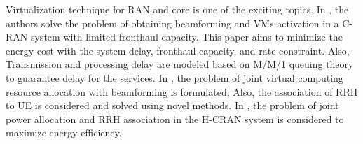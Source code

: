 \documentclass[conference]{IEEEtran}
\begin{document}
Virtualization technique for RAN and core is one of the exciting topics.  
In \cite{SystemCostMinimization,guo2016exploiting}, the authors solve the problem of obtaining beamforming and VMs activation in a C-RAN system with limited fronthaul capacity. 
This paper aims to minimize the energy cost with the system delay, fronthaul capacity, and rate constraint. 
Also, Transmission and processing delay are modeled based on M/M/1 queuing theory to guarantee delay for the services.
 In \cite{luong2018joint,luong2018novel}, the problem of joint virtual computing resource allocation with beamforming is formulated; Also, the association of RRH to UE is considered and solved using novel methods.
In \cite{ali2019energy,ali2019energy1,ali2018joint}, the problem of joint power allocation and RRH association in the H-CRAN system is considered to maximize energy efficiency.
\end{document}

